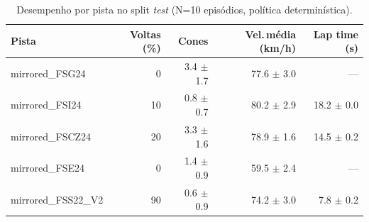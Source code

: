 \begin{table}[H]
\centering
\caption{Desempenho por pista no split \textit{test} (N=10 episódios, política determinística).}
\label{tab:per_track_test}
\begin{tabular}{lrrrr}
\toprule
\textbf{Pista} & \textbf{Voltas (\%)} & \textbf{Cones} & \textbf{Vel.\,m\'edia (km/h)} & \textbf{Lap time (s)} \\
\midrule
mirrored_FSG24 & 0 & 3.4 $\pm$ 1.7 & 77.6 $\pm$ 3.0 & --- \\
mirrored_FSI24 & 10 & 0.8 $\pm$ 0.7 & 80.2 $\pm$ 2.9 & 18.2 $\pm$ 0.0 \\
mirrored_FSCZ24 & 20 & 3.3 $\pm$ 1.6 & 78.9 $\pm$ 1.6 & 14.5 $\pm$ 0.2 \\
mirrored_FSE24 & 0 & 1.4 $\pm$ 0.9 & 59.5 $\pm$ 2.4 & --- \\
mirrored_FSS22_V2 & 90 & 0.6 $\pm$ 0.9 & 74.2 $\pm$ 3.0 & 7.8 $\pm$ 0.2 \\
\bottomrule
\end{tabular}
\end{table}
